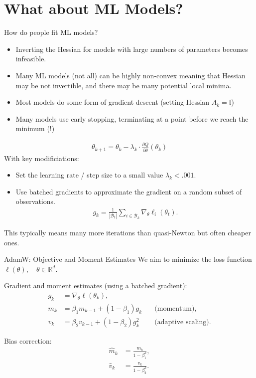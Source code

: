\section{What about ML Models?}

\begin{frame}{How do people fit ML models?}
\begin{itemize}
	\item Inverting the Hessian for models with large numbers of parameters becomes infeasible.
	\item Many ML models (not all) can be highly \alert{non-convex} meaning that Hessian may be not invertible, and there may be many potential \alert{local minima}.
	\item Most models do some form of \alert{gradient descent} (setting Hessian $A_k=\mathbb{I}$)
	\item Many models use \alert{early stopping}, terminating at a point before we reach the minimum (!)
\end{itemize}
\begin{align*}
\theta_{k+1} = \theta_k - \lambda_k \cdot \frac{\partial Q}{\partial \theta}(\theta_k)
\end{align*}
With key modificiations:
\begin{itemize}
	\item Set the \alert{learning rate / step size} to a small value $\lambda_k < .001$.
	\item Use \alert{batched gradients} to approximate the gradient on a random subset of observations.
	\begin{align*}
	g_k=\frac{1}{\left|\mathcal{B}_t\right|} \sum_{i \in \mathcal{B}_k} \nabla_\theta \ell_i\left(\theta_t\right) .
	\end{align*}
\end{itemize}
This typically means many more iterations than quasi-Newton but often cheaper ones.
\end{frame}

\begin{frame}{AdamW: Objective and Moment Estimates}
We aim to minimize the loss function $\ell(\theta), \quad \theta \in \mathbb{R}^d$.

Gradient and moment estimates (using a batched gradient):
\begin{align}
    g_k &= \nabla_\theta \ell(\theta_k), \\
    m_k &= \beta_1 m_{k-1} + (1 - \beta_1) g_k \quad &\text{(momentum)}, \\
    v_k &= \beta_2 v_{k-1} + (1 - \beta_2) g_k^2 \quad &\text{(adaptive scaling)}.
\end{align}

Bias correction:
\begin{align}
    \hat{m}_k &= \frac{m_k}{1 - \beta_1^k}, \\
    \hat{v}_k &= \frac{v_k}{1 - \beta_2^k}.
\end{align}

\end{frame}

